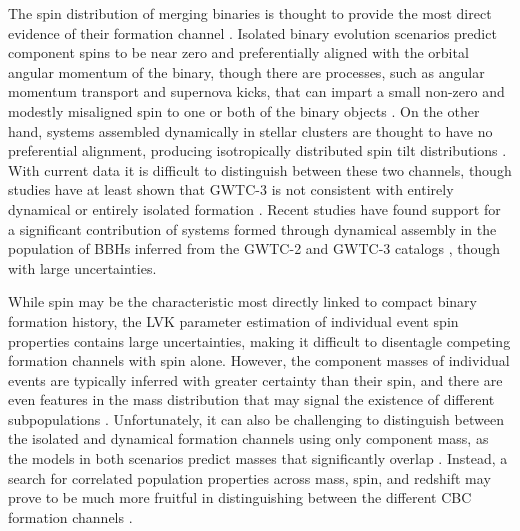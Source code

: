 The spin distribution of merging binaries is thought to provide the most direct evidence of their formation channel \citep{2017Natur.548..426F,2018ApJ...854L...9F}. Isolated binary evolution scenarios predict component spins to be near zero and preferentially aligned with the orbital angular momentum of the binary, though there are processes, such as angular momentum transport and supernova kicks, that can impart a small non-zero and modestly misaligned spin to one or both of the binary objects \citep{2203.0251, 1706.07053, 10.1051/0004-6361/201936204, 10.1051/0004-6361/202039804}. On the other hand, systems assembled dynamically in stellar clusters are thought to have no preferential alignment, producing isotropically distributed spin tilt distributions \citep{10.3847/2041-8205/832/1/L2,10.1103/PhysRevD.100.043027}. With current data it is difficult to distinguish between these two channels, though studies have at least shown that GWTC-3 is not consistent with entirely dynamical or entirely isolated formation \citep{2021arXiv211103634T,2022ApJ...937L..13C,2022arXiv220902206T,2022arXiv221012834E,10.3847/2041-8213/ac86c4}. Recent studies have found support for a significant contribution of systems formed through dynamical assembly in the population of BBHs inferred from the GWTC-2 and GWTC-3 catalogs \citep{2021ApJ...913L...7A,2021PhRvD.104h3010R,2021arXiv211103634T,2022ApJ...937L..13C,2021ApJ...921L..15G,2022arXiv220902206T,2022arXiv220906978V,2022arXiv221012834E}, though with large uncertainties. 

While spin may be the characteristic most directly linked to compact binary formation history, the LVK parameter estimation of individual event spin properties contains large uncertainties, making it difficult to disentagle competing formation channels with spin alone. However, the component masses of individual events are typically inferred with greater certainty than their spin, and there are even features in the mass distribution that may signal the existence of different subpopulations \citep{2021ApJ...913L..19T,2022ApJ...924..101E,2021arXiv211103634T,2022ApJ...928..155T,2022arXiv221012834E}. Unfortunately, it can also be challenging to distinguish between the isolated and dynamical formation channels using only component mass, as the models in both scenarios predict masses that significantly overlap \citep{1609.0591}. Instead, a search for correlated population properties across mass, spin, and redshift may prove to be much more fruitful in distinguishing between the different CBC formation channels \citep{2021ApJ...912...98F,2021ApJ...922L...5C,2022ApJ...931...17V,2022ApJ...932L..19B}. 

